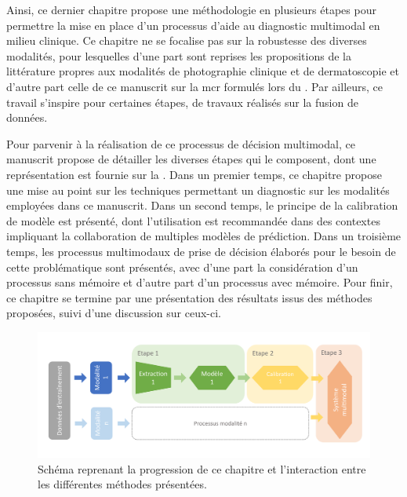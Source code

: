 Ainsi, ce dernier chapitre propose une méthodologie en plusieurs étapes pour permettre la mise en place d'un processus d'aide au diagnostic multimodal en milieu clinique. Ce chapitre ne se focalise pas sur la robustesse des diverses modalités, pour lesquelles d'une part sont reprises les propositions de la littérature propres aux modalités de photographie clinique et de dermatoscopie et d'autre part celle de ce manuscrit sur la \gls{mcr} formulés lors du . Par ailleurs, ce travail s'inspire pour certaines étapes, de travaux réalisés sur la fusion de données.

Pour parvenir à la réalisation de ce processus de décision multimodal, ce manuscrit propose de détailler les diverses étapes qui le composent, dont une représentation est fournie sur la . Dans un premier temps, ce chapitre propose une mise au point sur les techniques permettant un diagnostic sur les modalités employées dans ce manuscrit. Dans un second temps, le principe de la calibration de modèle est présenté, dont l'utilisation est recommandée dans des contextes impliquant la collaboration de multiples modèles de prédiction. Dans un troisième temps, les processus multimodaux de prise de décision élaborés pour le besoin de cette problématique sont présentés, avec d'une part la considération d'un processus sans mémoire et d'autre part d'un processus avec mémoire. Pour finir, ce chapitre se termine par une présentation des résultats issus des méthodes proposées, suivi d'une discussion sur ceux-ci.\par

\begin{figure}[H]
    \centering
    \includegraphics[width=0.9\linewidth]{contents/chapter_8/resources/scheme_multimodal_methodology.pdf}
    \caption{Schéma reprenant la progression de ce chapitre et l'interaction entre les différentes méthodes présentées.}
    \label{fig:scheme_multimodal_methodology}
\end{figure}\par

